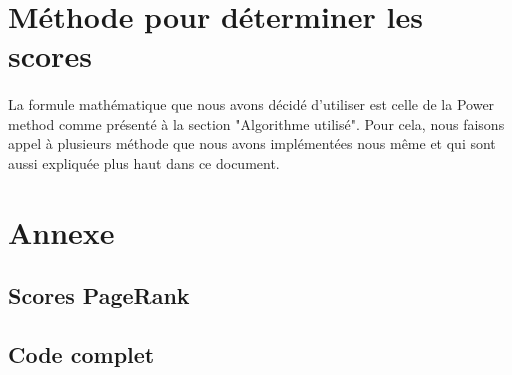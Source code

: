 \documentclass[10pt,a4paper]{article}
\begin{document}
\section{Méthode pour déterminer les scores}


\paragraph{}La formule mathématique que nous avons décidé d'utiliser est celle de la Power method comme présenté à la section "Algorithme utilisé". Pour cela, nous faisons appel à plusieurs méthode que nous avons implémentées nous même et qui sont aussi expliquée plus haut dans ce document.%

\section{Annexe}

\subsection{Scores PageRank}


\subsection{Code complet}

\end{document}
